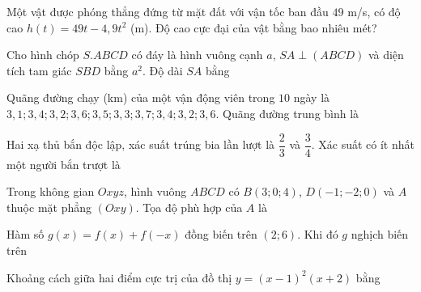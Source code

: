 \begin{ex}
Một vật được phóng thẳng đứng từ mặt đất với vận tốc ban đầu $49$ m/s, có độ cao
$h(t)=49t-4{,}9t^2$ (m). Độ cao cực đại của vật bằng bao nhiêu mét?
\end{ex}

\begin{ex}
Cho hình chóp $S.ABCD$ có đáy là hình vuông cạnh $a$, $SA\perp(ABCD)$ và diện tích tam giác $SBD$ bằng $a^2$. Độ dài $SA$ bằng
\end{ex}

\begin{ex}
Quãng đường chạy (km) của một vận động viên trong $10$ ngày là
$3{,}1;3{,}4;3{,}2;3{,}6;3{,}5;3{,}3;3{,}7;3{,}4;3{,}2;3{,}6$.
Quãng đường trung bình là
\end{ex}

\begin{ex}
Hai xạ thủ bắn độc lập, xác suất trúng bia lần lượt là $\dfrac23$ và $\dfrac34$. Xác suất có ít nhất một người bắn trượt là
\end{ex}

\begin{ex}
Trong không gian $Oxyz$, hình vuông $ABCD$ có $B(3;0;4)$, $D(-1;-2;0)$ và $A$ thuộc mặt phẳng $(Oxy)$. Tọa độ phù hợp của $A$ là
\end{ex}

\begin{ex}
Hàm số $g(x)=f(x)+f(-x)$ đồng biến trên $(2;6)$. Khi đó $g$ nghịch biến trên
\end{ex}

\begin{ex}
Khoảng cách giữa hai điểm cực trị của đồ thị $y=(x-1)^2(x+2)$ bằng
\end{ex}

